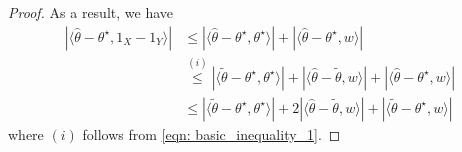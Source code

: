 \documentclass{article}
\newcommand{\abs}[1]{\left \lvert #1 \right \rvert}
\newcommand{\dotp}[2]{\langle #1, #2 \rangle}
\newcommand{\1}{\mathbb{I}}
\theoremstyle{alden}
\theoremstyle{aldenthm}
\theoremstyle{definition}
\theoremstyle{remark}
\begin{document}
\begin{proof}
	As a result, we have
	\begin{align*}
	\abs{\dotp{\widehat{\theta} - \theta^{\star}}{1_X - 1_Y}} & \leq \abs{\dotp{\widehat{\theta} - \theta^{\star}}{\theta^{\star}} } + \abs{\dotp{\widehat{\theta} - \theta^{\star}}{w} } \\
	& \overset{(i)}{\leq} \abs{\dotp{\widetilde{\theta} - \theta^{\star}}{\theta^{\star}} } + \abs{\dotp{\widehat{\theta} - \widetilde{\theta}}{w} } + \abs{\dotp{\widehat{\theta} - \theta^{\star}}{w} } \\
	& \leq \abs{\dotp{\widetilde{\theta} - \theta^{\star}}{\theta^{\star}} } + 2\abs{\dotp{\widehat{\theta} - \widetilde{\theta}}{w} } + \abs{\dotp{\widetilde{\theta} - \theta^{\star}}{w}}
	\end{align*}
	where $(i)$ follows from \eqref{eqn: basic_inequality_1}.
\end{proof}

\clearpage



\end{document}
